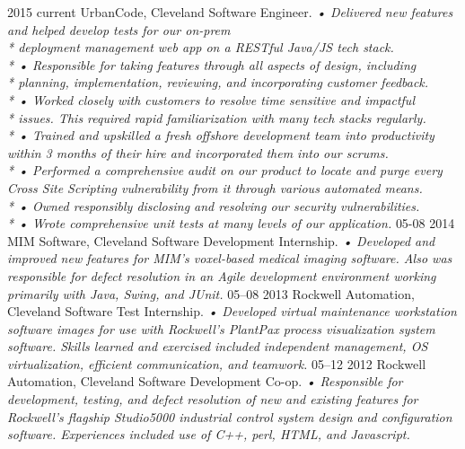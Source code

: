 \documentclass[]{friggeri-cv}
\begin{document}
\begin{entrylist}
  \entry
    {2015 current}
    {UrbanCode, Cleveland}
    {Software Engineer.}
    {\emph{
    •	Delivered new features and helped develop tests for our on-prem \\* deployment management web app on a RESTful Java/JS tech stack.\\*
    •   Responsible for taking features through all aspects of design, including \\* planning, implementation, reviewing, and incorporating customer feedback.\\*
    •	Worked closely with customers to resolve time sensitive and impactful\\* issues. This required rapid familiarization with many tech stacks regularly.\\*
    •	Trained and upskilled a fresh offshore development team into productivity within 3 months of their hire and incorporated them into our scrums. \\*
    •	Performed a comprehensive audit on our product to locate and purge every Cross Site Scripting vulnerability from it through various automated means.\\*
    •	Owned responsibly disclosing and resolving our security vulnerabilities.\\*
    •	Wrote comprehensive unit tests at many levels of our application.
}}
  \entry
    {05-08 2014}
    {MIM Software, Cleveland}
    {Software Development Internship.}
    {\emph{
    •	Developed and improved new features for MIM's voxel-based medical imaging software. Also was responsible for defect resolution in an Agile development environment working primarily with Java, Swing, and JUnit.}}
  \entry
    {05–08 2013}
    {Rockwell Automation, Cleveland}
    {Software Test Internship.}
    {\emph{
    •	Developed virtual maintenance workstation software images for use with Rockwell’s PlantPax process visualization system software. Skills learned and exercised included independent management, OS virtualization, efficient communication, and teamwork.}}
  \entry
    {05–12 2012}
    {Rockwell Automation, Cleveland}
    {Software Development Co-op.}
    {\emph{
    •	Responsible for development, testing, and defect resolution of new and existing features for Rockwell’s flagship Studio5000 industrial control system design and configuration software.  Experiences included use of C++, perl, HTML, and Javascript.}}
\end{entrylist}
\end{document}
